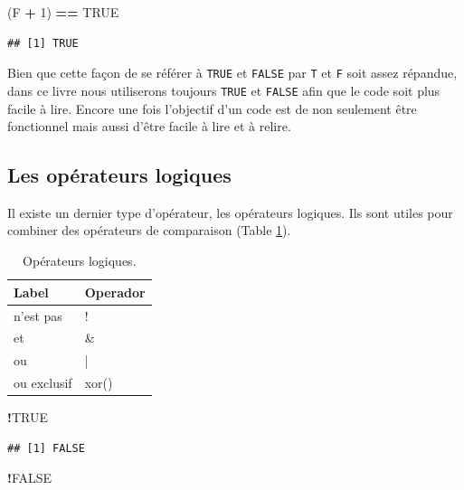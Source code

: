 \documentclass[
]{book}
\newenvironment{Shaded}{\begin{snugshade}}{\end{snugshade}}
\newcommand{\DecValTok}[1]{\textcolor[rgb]{0.00,0.00,0.81}{#1}}
\newcommand{\NormalTok}[1]{#1}
\newcommand{\OperatorTok}[1]{\textcolor[rgb]{0.81,0.36,0.00}{\textbf{#1}}}
\newcommand{\OtherTok}[1]{\textcolor[rgb]{0.56,0.35,0.01}{#1}}
\newcommand{\StringTok}[1]{\textcolor[rgb]{0.31,0.60,0.02}{#1}}
\begin{document}
\begin{Shaded}
\begin{Highlighting}[]
\NormalTok{(F }\OperatorTok{+}\StringTok{ }\DecValTok{1}\NormalTok{) }\OperatorTok{==}\StringTok{ }\OtherTok{TRUE}
\end{Highlighting}
\end{Shaded}

\begin{verbatim}
## [1] TRUE
\end{verbatim}

Bien que cette façon de se référer à \texttt{TRUE} et \texttt{FALSE} par \texttt{T} et \texttt{F} soit assez répandue, dans ce livre nous utiliserons toujours \texttt{TRUE} et \texttt{FALSE} afin que le code soit plus facile à lire. Encore une fois l'objectif d'un code est de non seulement être fonctionnel mais aussi d'être facile à lire et à relire.

\hypertarget{l011oplog}{%
\subsection{Les opérateurs logiques}\label{l011oplog}}

Il existe un dernier type d'opérateur, les opérateurs logiques. Ils sont utiles pour combiner des opérateurs de comparaison (Table \ref{tab:tabOpLog}).

\begin{table}

\caption{\label{tab:tabOpLog}Opérateurs logiques.\label{tab:tabOpLog}}
\centering
\begin{tabular}[t]{l|l}
\hline
Label & Operador\\
\hline
n'est pas & !\\
\hline
et & \&\\
\hline
ou & |\\
\hline
ou exclusif & xor()\\
\hline
\end{tabular}
\end{table}

\begin{Shaded}
\begin{Highlighting}[]
\OperatorTok{!}\OtherTok{TRUE}
\end{Highlighting}
\end{Shaded}

\begin{verbatim}
## [1] FALSE
\end{verbatim}

\begin{Shaded}
\begin{Highlighting}[]
\OperatorTok{!}\OtherTok{FALSE}
\end{Highlighting}
\end{Shaded}
\end{document}
